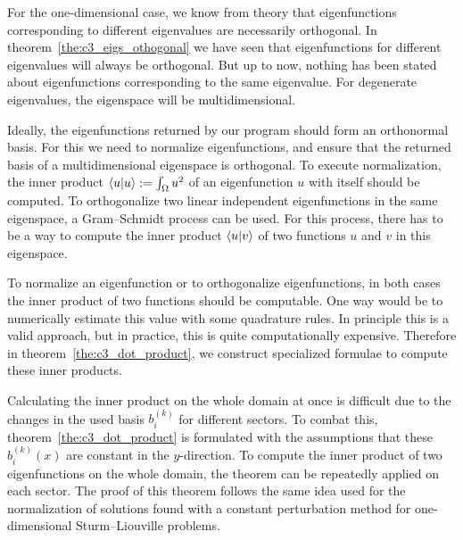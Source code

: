 For the one-dimensional case, we know from theory that eigenfunctions corresponding to different eigenvalues are necessarily orthogonal. In theorem~\ref{the:c3_eigs_othogonal} we have seen that eigenfunctions for different eigenvalues will always be orthogonal. But up to now, nothing has been stated about eigenfunctions corresponding to the same eigenvalue. For degenerate eigenvalues, the eigenspace will be multidimensional.

Ideally, the eigenfunctions returned by our program should form an orthonormal basis. For this we need to normalize eigenfunctions, and ensure that the returned basis of a multidimensional eigenspace is orthogonal. To execute normalization, the inner product $\bra{u}\ket{u} := \int_\Omega u^2$  of an eigenfunction $u$ with itself should be computed. To orthogonalize two linear independent eigenfunctions in the same eigenspace, a Gram--Schmidt process can be used. For this process, there has to be a way to compute the inner product $\bra{u}\ket{v}$ of two functions $u$ and $v$ in this eigenspace.

To normalize an eigenfunction or to orthogonalize eigenfunctions, in both cases the inner product of two functions should be computable. One way would be to numerically estimate this value with some quadrature rules. In principle this is a valid approach, but in practice, this is quite computationally expensive. Therefore in theorem~\ref{the:c3_dot_product}, we construct specialized formulae to compute these inner products.

Calculating the inner product on the whole domain at once is difficult due to the changes in the used basis $b_i^{(k)}$ for different sectors. To combat this, theorem~\ref{the:c3_dot_product} is formulated with the assumptions that these $b_i^{(k)}(x)$ are constant in the $y$-direction. To compute the inner product of two eigenfunctions on the whole domain, the theorem can be repeatedly applied on each sector. The proof of this theorem follows the same idea used for the normalization of solutions found with a constant perturbation method for one-dimensional Sturm--Liouville problems.

